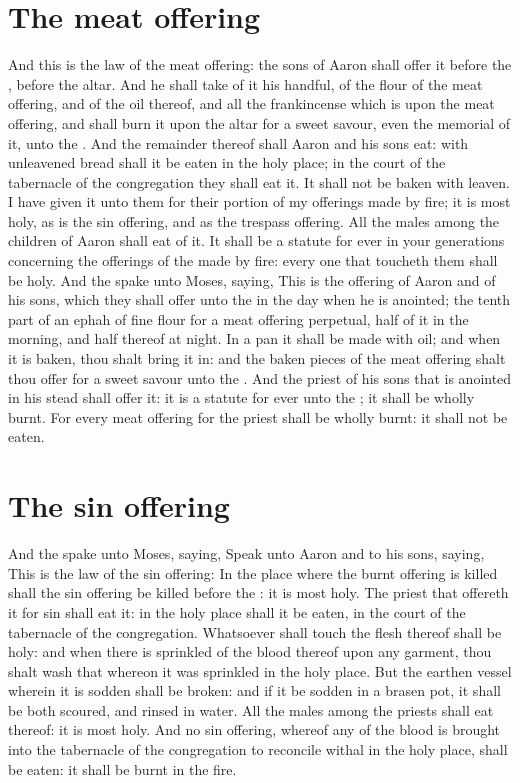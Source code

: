 \begin{biblechapter}
\section*{The meat offering}
\verse And this is the law of the meat offering: the sons of Aaron shall offer it before the \LORD, before the altar.
\verse And he shall take of it his handful, of the flour of the meat offering, and of the oil thereof, and all the frankincense which is upon the meat offering, and shall burn it upon the altar for a sweet savour, even the memorial of it, unto the \LORD.
\verse And the remainder thereof shall Aaron and his sons eat: with unleavened bread shall it be eaten in the holy place; in the court of the tabernacle of the congregation they shall eat it.
\verse It shall not be baken with leaven. I have given it unto them for their portion of my offerings made by fire; it is most holy, as is the sin offering, and as the trespass offering.
\verse All the males among the children of Aaron shall eat of it. It shall be a statute for ever in your generations concerning the offerings of the \LORD made by fire: every one that toucheth them shall be holy.
\verse And the \LORD spake unto Moses, saying,
\verse This is the offering of Aaron and of his sons, which they shall offer unto the \LORD in the day when he is anointed; the tenth part of an ephah of fine flour for a meat offering perpetual, half of it in the morning, and half thereof at night.
\verse In a pan it shall be made with oil; and when it is baken, thou shalt bring it in: and the baken pieces of the meat offering shalt thou offer for a sweet savour unto the \LORD.
\verse And the priest of his sons that is anointed in his stead shall offer it: it is a statute for ever unto the \LORD; it shall be wholly burnt.
\verse For every meat offering for the priest shall be wholly burnt: it shall not be eaten.
\section*{The sin offering}
\verse And the \LORD spake unto Moses, saying,
\verse Speak unto Aaron and to his sons, saying, This is the law of the sin offering: In the place where the burnt offering is killed shall the sin offering be killed before the \LORD: it is most holy.
\verse The priest that offereth it for sin shall eat it: in the holy place shall it be eaten, in the court of the tabernacle of the congregation.
\verse Whatsoever shall touch the flesh thereof shall be holy: and when there is sprinkled of the blood thereof upon any garment, thou shalt wash that whereon it was sprinkled in the holy place.
\verse But the earthen vessel wherein it is sodden shall be broken: and if it be sodden in a brasen pot, it shall be both scoured, and rinsed in water.
\verse All the males among the priests shall eat thereof: it is most holy.
\verse And no sin offering, whereof any of the blood is brought into the tabernacle of the congregation to reconcile withal in the holy place, shall be eaten: it shall be burnt in the fire.
\end{biblechapter}

